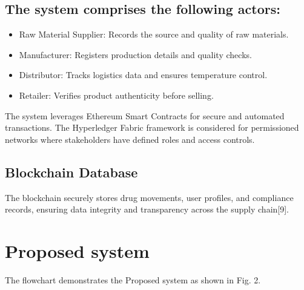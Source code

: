 \documentclass[conference]{IEEEtran}
\begin{document}
\subsection{The system comprises the following actors:} 

\begin{itemize}
    \item Raw Material Supplier: Records the source and quality of raw materials.
    \item Manufacturer: Registers production details and quality checks.
    \item Distributor: Tracks logistics data and ensures temperature control.
    \item Retailer: Verifies product authenticity before selling.
\end{itemize}

The system leverages Ethereum Smart Contracts for secure and automated transactions. The Hyperledger Fabric framework is considered for permissioned networks where stakeholders have defined roles and access controls.

\subsection{Blockchain Database} The blockchain securely stores drug movements, user profiles, and compliance records, ensuring data integrity and transparency across the supply chain[9].



\section{Proposed system}
The flowchart demonstrates the Proposed system as shown in Fig. 2.
\end{document}
